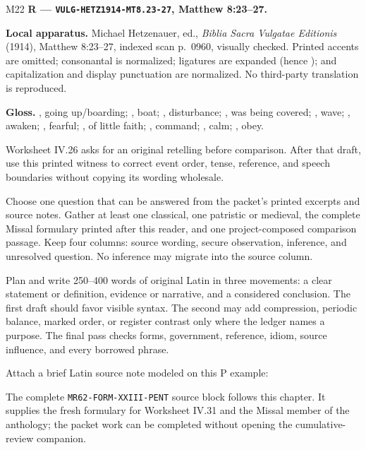 \begin{courseunit}{M22}
\textbf{R --- \texttt{VULG-HETZ1914-MT8.23-27}, Matthew 8:23--27.}

\ReaderMatthewStorm

\textbf{Local apparatus.} Michael Hetzenauer, ed., \textit{Biblia Sacra
Vulgatae Editionis} (1914), Matthew 8:23--27, indexed scan p.~0960,
visually checked.  Printed accents are omitted; consonantal  is
normalized; ligatures are expanded (hence ); and capitalization
and display punctuation are normalized.  No third-party translation is
reproduced.

\textbf{Gloss.} , going up/boarding;
, boat; , disturbance; , was
being covered; , wave; , awaken;
, fearful; , of little faith;
, command; , calm;
, obey.

Worksheet IV.26 asks for an original retelling before comparison.  After that
draft, use this printed witness to correct event order, tense, reference, and
speech boundaries without copying its wording wholesale.

Choose one question that can be answered from the packet's printed excerpts
and source notes.  Gather at least one classical, one patristic or medieval,
the complete Missal formulary printed after this reader, and one
project-composed comparison passage.  Keep four columns: source wording,
secure observation, inference, and unresolved question.  No inference may
migrate into the source column.

Plan and write 250--400 words of original Latin in three movements: a clear
statement or definition, evidence or narrative, and a considered conclusion.
The first draft should favor visible syntax.  The second may add compression,
periodic balance, marked order, or register contrast only where the ledger
names a purpose.  The final pass checks forms, government, reference, idiom,
source influence, and every borrowed phrase.

Attach a brief Latin source note modeled on this P example:


The complete \texttt{MR62-FORM-XXIII-PENT} source block follows this chapter.
It supplies the fresh formulary for Worksheet IV.31 and the Missal member of
the anthology; the packet work can be completed without opening the
cumulative-review companion.


\end{courseunit}
